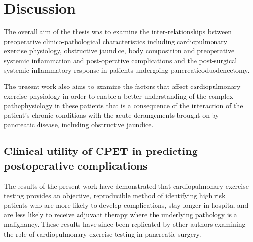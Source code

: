 
\chapter{Discussion}
\label{ch_discussion}


\clearpage

The overall aim of the thesis was to examine the inter-relationships between preoperative clinico-pathological characteristics including cardiopulmonary exercise physiology, obstructive jaundice, body composition and preoperative systemic inflammation and post-operative complications and the post-surgical systemic inflammatory response in patients undergoing pancreaticoduodenectomy.

The present work also aims to examine the factors that affect cardiopulmonary exercise physiology in order to enable a better understanding of the complex pathophysiology in these patients that is a consequence of the interaction of the patient's chronic conditions with the acute derangements brought on by pancreatic disease, including obstructive jaundice.

\section{Clinical utility of CPET in predicting postoperative complications}
The results of the present work have demonstrated that cardiopulmonary exercise testing provides an objective, reproducible method of identifying high risk patients who are more likely to develop complications, stay longer in hospital and are less likely to receive adjuvant therapy where the underlying pathology is a malignancy. 
These results have since been replicated by other authors examining the role of cardiopulmonary exercise testing in pancreatic surgery. \parencite{ausania_effects_2012, ausania_double_2012, junejo_cardiopulmonary_2014}

